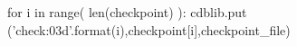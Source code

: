 \documentclass[12pt]{cdblatex}
\begin{document}

\bgroup
{}
\begin{cadabra}
   for i in range( len(checkpoint) ):
      cdblib.put ('check{:03d}'.format(i),checkpoint[i],checkpoint_file)
\end{cadabra}
\egroup
\end{document}
